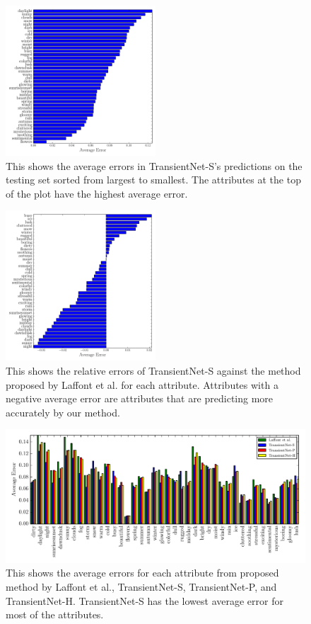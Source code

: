 \documentclass{article}
\begin{document}
\begin{figure}[t]
	\centering
		\includegraphics[width=0.5\textwidth]{figs/sorted_err_cmr.pdf}
		\caption{This shows the average errors in TransientNet-S's predictions on the 
						 testing set sorted from largest to smallest.  The attributes at 
						 the top of the plot have the highest average error.}
		\label{fig:sort}
\end{figure}

\begin{figure}[t]
	\centering
		\includegraphics[width=0.5\textwidth]{figs/rel_err_cmr.pdf}
		\caption{This shows the relative errors of TransientNet-S against the method 
						 proposed by Laffont et al. for each attribute.  Attributes with a 
						 negative average error are attributes that are predicting more 
						 accurately by our method.}
		\label{fig:relerr}
\end{figure}

\begin{figure}[t]
	\centering
		\includegraphics[width=1.0\textwidth]{figs/avg_err_compare_cmr.pdf}
		\caption{This shows the average errors for each attribute from proposed method
						 by Laffont et al., TransientNet-S, TransientNet-P, and TransientNet-H.  
             TransientNet-S has the lowest average error for most of the attributes.}
		\label{fig:compare}
\end{figure}
\end{document}
